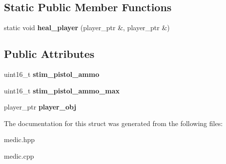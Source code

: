 \subsection*{Static Public Member Functions}
\begin{DoxyCompactItemize}
\item 
\mbox{\label{structmods_1_1classes_1_1medic_aab85d19804f9d8ea3942a140e839d3df}} 
static void {\bfseries heal\+\_\+player} (player\+\_\+ptr \&, player\+\_\+ptr \&)
\end{DoxyCompactItemize}
\subsection*{Public Attributes}
\begin{DoxyCompactItemize}
\item 
\mbox{\label{structmods_1_1classes_1_1medic_afed4081eb1abe02e2decebaa9cb4097f}} 
uint16\+\_\+t {\bfseries stim\+\_\+pistol\+\_\+ammo}
\item 
\mbox{\label{structmods_1_1classes_1_1medic_aa5bbdb9d4a2837cdd7969ac19f351f30}} 
uint16\+\_\+t {\bfseries stim\+\_\+pistol\+\_\+ammo\+\_\+max}
\item 
\mbox{\label{structmods_1_1classes_1_1medic_ad3752e5aa544d388486ef54ec810f18f}} 
player\+\_\+ptr {\bfseries player\+\_\+obj}
\end{DoxyCompactItemize}


The documentation for this struct was generated from the following files\+:\begin{DoxyCompactItemize}
\item 
medic.\+hpp\item 
medic.\+cpp\end{DoxyCompactItemize}
